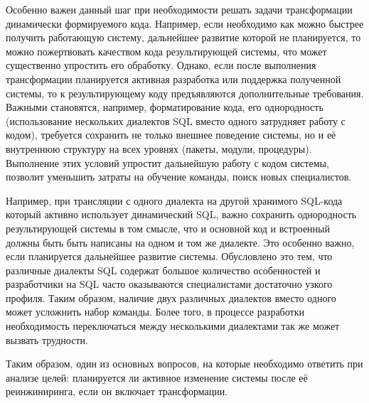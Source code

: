 \begin{enumerate}
Особенно важен данный шаг при необходимости решать задачи трансформации динамически формируемого кода. Например, если необходимо как можно быстрее получить работающую систему, дальнейшее развитие которой не планируется, то можно пожертвовать качеством кода результирующей системы, что может существенно упростить его обработку. Однако, если после выполнения трансформации планируется активная разработка или поддержка полученной системы, то к результирующему коду предъявляются дополнительные требования. Важными становятся, например, форматирование кода, его однородность (использование нескольких диалектов SQL вместо одного затрудняет работу с кодом), требуется сохранить не только внешнее поведение системы, но и её внутреннюю структуру на всех уровнях (пакеты, модули, процедуры). Выполнение этих условий упростит дальнейшую работу с кодом системы, позволит уменьшить затраты на обучение команды, поиск новых специалистов.
  
  Например, при трансляции с одного диалекта на другой хранимого SQL-кода который активно использует динамический SQL, важно сохранить однородность результирующей системы в том смысле, что и основной код и встроенный должны быть быть написаны на одном и том же диалекте. Это особенно важно, если планируется дальнейшее развитие системы. Обусловлено это тем, что различные диалекты SQL содержат большое количество особенностей и разработчики на SQL часто оказываются специалистами достаточно узкого профиля. Таким образом, наличие двух различных диалектов вместо одного может усложнить набор команды. Более того, в процессе разработки необходимость переключаться между несколькими диалектами так же может вызвать трудности.
  
  Таким образом, один из основных вопросов, на которые необходимо ответить при анализе целей: планируется ли активное изменение системы после её реинжиниринга, если он включает трансформации.
  

\end{enumerate}
